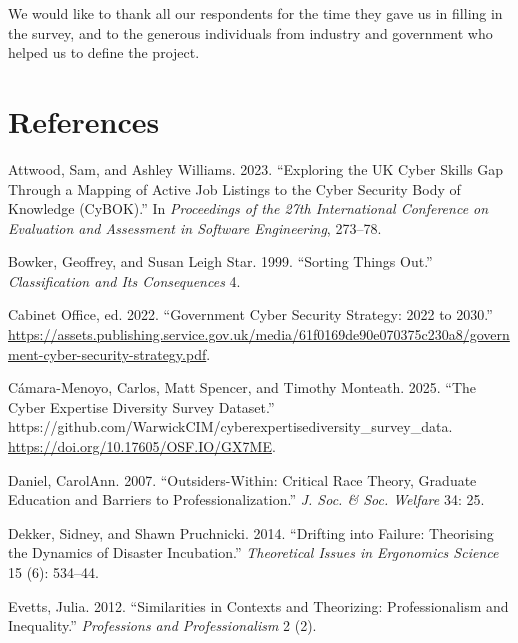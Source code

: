 \documentclass[
  a4paper,
]{book}
\newlength{\cslhangindent}
\newenvironment{CSLReferences}[2] %
 {\begin{list}{}{%
  \setlength{\itemindent}{0pt}
  \setlength{\leftmargin}{0pt}
  \setlength{\parsep}{0pt}
  \ifodd #1
   \setlength{\leftmargin}{\cslhangindent}
   \setlength{\itemindent}{-1\cslhangindent}
  \fi
  \setlength{\itemsep}{#2\baselineskip}}}
 {\end{list}}
\begin{document}
We would like to thank all our respondents for the time they gave us in
filling in the survey, and to the generous individuals from industry and
government who helped us to define the project.


\chapter*{References}\label{references}


\label{refs}
\begin{CSLReferences}{1}{0}
Attwood, Sam, and Ashley Williams. 2023. {``Exploring the UK Cyber
Skills Gap Through a Mapping of Active Job Listings to the Cyber
Security Body of Knowledge (CyBOK).''} In \emph{Proceedings of the 27th
International Conference on Evaluation and Assessment in Software
Engineering}, 273--78.

Bowker, Geoffrey, and Susan Leigh Star. 1999. {``Sorting Things Out.''}
\emph{Classification and Its Consequences} 4.

Cabinet Office, ed. 2022. {``Government {Cyber Security Strategy}: 2022
to 2030.''}
\url{https://assets.publishing.service.gov.uk/media/61f0169de90e070375c230a8/government-cyber-security-strategy.pdf}.

Cámara-Menoyo, Carlos, Matt Spencer, and Timothy Monteath. 2025. {``The
{Cyber Expertise Diversity Survey Dataset}.''}
https://github.com/WarwickCIM/cyberexpertisediversity\_survey\_data.
\url{https://doi.org/10.17605/OSF.IO/GX7ME}.

Daniel, CarolAnn. 2007. {``Outsiders-Within: Critical Race Theory,
Graduate Education and Barriers to Professionalization.''} \emph{J. Soc.
\& Soc. Welfare} 34: 25.

Dekker, Sidney, and Shawn Pruchnicki. 2014. {``Drifting into Failure:
Theorising the Dynamics of Disaster Incubation.''} \emph{Theoretical
Issues in Ergonomics Science} 15 (6): 534--44.

Evetts, Julia. 2012. {``Similarities in Contexts and Theorizing:
Professionalism and Inequality.''} \emph{Professions and
Professionalism} 2 (2).


\end{CSLReferences}
\end{document}
